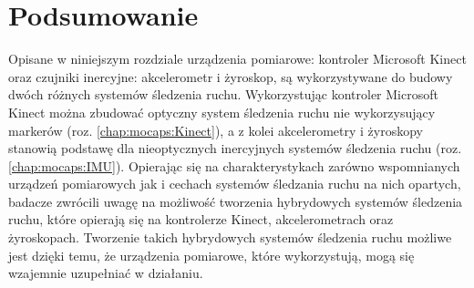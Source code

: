 \section{Podsumowanie}
Opisane w niniejszym rozdziale urządzenia pomiarowe: kontroler Microsoft Kinect oraz czujniki inercyjne: akcelerometr i żyroskop, są wykorzystywane do budowy dwóch różnych systemów śledzenia ruchu. Wykorzystując kontroler Microsoft Kinect można zbudować optyczny system śledzenia ruchu nie wykorzysujący markerów (roz. \ref{chap:mocaps:Kinect}), a z kolei akcelerometry i żyroskopy stanowią podstawę dla nieoptycznych inercyjnych systemów śledzenia ruchu (roz. \ref{chap:mocaps:IMU}). Opierając się na charakterystykach zarówno wspomnianych urządzeń pomiarowych jak i cechach systemów śledzania ruchu na nich opartych, badacze zwrócili uwagę na możliwość tworzenia hybrydowych systemów śledzenia ruchu, które opierają się na kontrolerze Kinect, akcelerometrach oraz żyroskopach. Tworzenie takich hybrydowych systemów śledzenia ruchu możliwe jest dzięki temu, że urządzenia pomiarowe, które wykorzystują, mogą się wzajemnie uzupełniać w działaniu.
		
		
		
		
		
		
		
